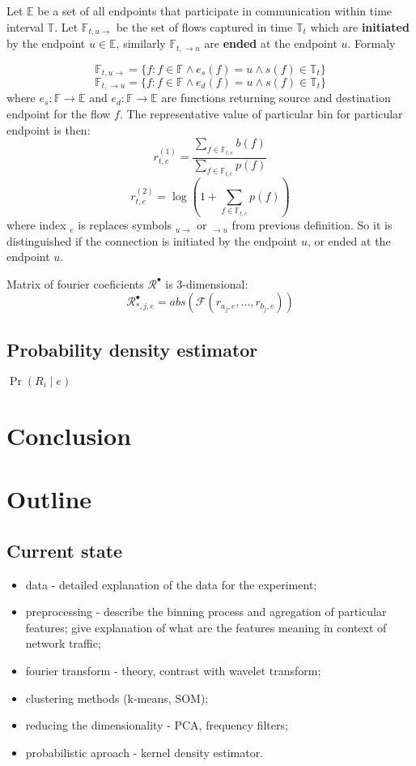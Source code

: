 \documentclass[a4paper]{IEEEtran}
\begin{document}
Let $\mathbb{E}$ be a set of all endpoints that
participate in communication within time interval $\mathbb{T}$.
Let $\mathbb{F}_{t,u \rightarrow}$ be the set of flows captured in
time $\mathbb{T}_{t}$ %
which are \textbf{initiated} by the endpoint $u \in \mathbb{E}$,
similarly $\mathbb{F}_{t, \rightarrow u}$ are \textbf{ended} at the
endpoint $u$. Formaly

\[
\mathbb{F}_{t,u \rightarrow} = \{f : f \in \mathbb{F} \wedge e_{s}(f) = u \wedge s(f) \in \mathbb{T}_t \}
\]
\[
\mathbb{F}_{t, \rightarrow u} = \{f : f \in \mathbb{F} \wedge e_{d}(f) = u \wedge s(f) \in \mathbb{T}_t \}
\]
where $e_{s}:\mathbb{F}\rightarrow \mathbb{E}$ and
$e_{d}:\mathbb{F}\rightarrow \mathbb{E}$ 
are functions returning source and destination endpoint for the 
flow $f$.
The representative value of particular bin for particular endpoint is 
then:
\[
r_{t,e}^{(1)} = \frac{\sum\limits_{f\in \mathbb{F}_{t,e}}b(f)}{\sum\limits_{f\in \mathbb{F}_{t,e}}p(f)}
\]
\[
r_{t,e}^{(2)} = \log(1+\sum\limits_{f\in \mathbb{F}_{t,e}}p(f))
\]
where index ${}_e$ is replaces symbols ${}_{u\rightarrow}$ or 
${}_{\rightarrow u}$ from previous definition. So it is distinguished 
if the connection is initiated by the endpoint $u$, or ended at the
endpoint $u$.

Matrix of fourier coeficients $\mathcal{R}^\bullet$ is 3-dimensional:
\[
\mathcal{R}^\bullet_{*,j,e} = abs(\mathcal{F}(r_{a_j,e}, ..., r_{b_j,e}))
\]


\subsection{Probability density estimator}
$\Pr(R_i\mid e)$


\section{Conclusion}


\section{Outline}
\subsection{Current state}
\begin{itemize}
	\item data - detailed explanation of the data for the experiment;
	\item preprocessing - describe the binning process and agregation of particular features; give explanation of what are the features meaning in context of network traffic;
	\item fourier transform - theory, contrast with wavelet transform;
	\item clustering methods (k-means, SOM);
	\item reducing the dimensionality - PCA, frequency filters;
	\item probabilistic aproach - kernel density estimator.
\end{itemize}
\end{document}
